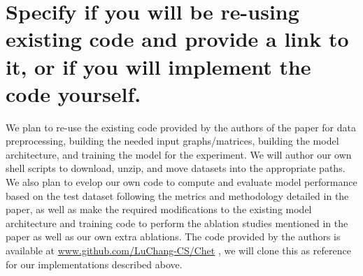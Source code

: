 \documentclass[11pt,a4paper]{article}
\begin{document}
\section{Specify if you will be re-using existing code and provide a link to it,
or if you will implement the code yourself.}
We plan to re-use the existing code provided by the authors of the paper for
data preprocessing, building the needed input graphs/matrices, building the
model architecture, and training the model for the experiment. We will author
our own shell scripts to download, unzip, and move datasets into the appropriate
paths. We also plan to evelop our own code to compute and evaluate model
performance based on the test dataset following the metrics and methodology
detailed in the paper, as well as make the required modifications to the
existing model architecture and training code to perform the ablation studies
mentioned in the paper as well as our own extra ablations. The code provided by
the authors is available at \url {www.github.com/LuChang-CS/Chet}
\cite{chet}, we will clone this as reference for our implementations described
above.




\end{document}
